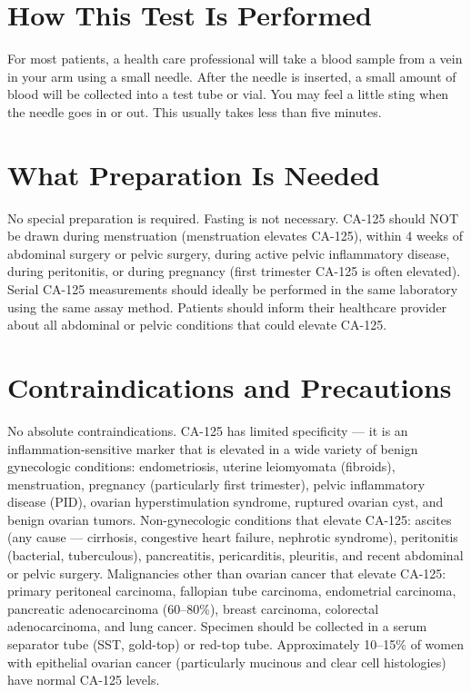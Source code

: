 \section*{How This Test Is Performed}
For most patients, a health care professional will take a blood sample from a vein in your arm using a small needle. After the needle is inserted, a small amount of blood will be collected into a test tube or vial. You may feel a little sting when the needle goes in or out. This usually takes less than five minutes.

\section*{What Preparation Is Needed}
No special preparation is required. Fasting is not necessary. CA-125 should NOT be drawn during menstruation (menstruation elevates CA-125), within 4 weeks of abdominal surgery or pelvic surgery, during active pelvic inflammatory disease, during peritonitis, or during pregnancy (first trimester CA-125 is often elevated). Serial CA-125 measurements should ideally be performed in the same laboratory using the same assay method. Patients should inform their healthcare provider about all abdominal or pelvic conditions that could elevate CA-125.

\section*{Contraindications and Precautions}
No absolute contraindications. CA-125 has limited specificity --- it is an inflammation-sensitive marker that is elevated in a wide variety of benign gynecologic conditions: endometriosis, uterine leiomyomata (fibroids), menstruation, pregnancy (particularly first trimester), pelvic inflammatory disease (PID), ovarian hyperstimulation syndrome, ruptured ovarian cyst, and benign ovarian tumors. Non-gynecologic conditions that elevate CA-125: ascites (any cause --- cirrhosis, congestive heart failure, nephrotic syndrome), peritonitis (bacterial, tuberculous), pancreatitis, pericarditis, pleuritis, and recent abdominal or pelvic surgery. Malignancies other than ovarian cancer that elevate CA-125: primary peritoneal carcinoma, fallopian tube carcinoma, endometrial carcinoma, pancreatic adenocarcinoma (60--80\%), breast carcinoma, colorectal adenocarcinoma, and lung cancer. Specimen should be collected in a serum separator tube (SST, gold-top) or red-top tube. Approximately 10--15\% of women with epithelial ovarian cancer (particularly mucinous and clear cell histologies) have normal CA-125 levels.

